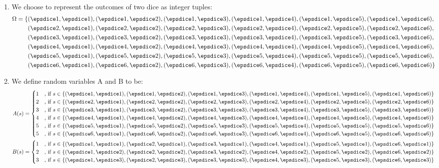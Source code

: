 \paragraph{}
\begin{enumerate}[label=\alph*.]
\item
We choose to represent the outcomes of two dice as integer tuples:
\begin{align*}
\Omega = \{
&(\dA,\dA), (\dA,\dB), (\dA,\dC), (\dA,\dD), (\dA,\dE), (\dA,\dF),  \\
&(\dB,\dA), (\dB,\dB), (\dB,\dC), (\dB,\dD), (\dB,\dE), (\dB,\dF),  \\
&(\dC,\dA), (\dC,\dB), (\dC,\dC), (\dC,\dD), (\dC,\dE), (\dC,\dF),  \\
&(\dD,\dA), (\dD,\dB), (\dD,\dC), (\dD,\dD), (\dD,\dE), (\dD,\dF),  \\
&(\dE,\dA), (\dE,\dB), (\dE,\dC), (\dE,\dD), (\dE,\dE), (\dE,\dF),  \\
&(\dF,\dA), (\dF,\dB), (\dF,\dC), (\dF,\dD), (\dF,\dE), (\dF,\dF) \}
\end{align*}
\item
We define random variables A and B to be:
\begin{align*}
A(s) =
\begin{cases}
1 &\text{, if } s \in \{ (\dA, \dA), (\dA,\dB), (\dA,\dC), (\dA,\dD), (\dA,\dE), (\dA,\dF) \} \\
2 &\text{, if } s \in \{ (\dB, \dA), (\dB,\dB), (\dB,\dC), (\dB,\dD), (\dB,\dE), (\dB,\dF) \} \\
3 &\text{, if } s \in \{ (\dC, \dA), (\dC,\dB), (\dC,\dC), (\dC,\dD), (\dC,\dE), (\dC,\dF) \} \\
4 &\text{, if } s \in \{ (\dD, \dA), (\dD,\dB), (\dD,\dC), (\dD,\dD), (\dD,\dE), (\dD,\dF) \} \\
5 &\text{, if } s \in \{ (\dE, \dA), (\dE,\dB), (\dE,\dC), (\dE,\dD), (\dE,\dE), (\dE,\dF) \} \\
5 &\text{, if } s \in \{ (\dF, \dA), (\dF,\dB), (\dF,\dC), (\dF,\dD), (\dF,\dE), (\dF,\dF) \}
\end{cases} \\
B(s) =
\begin{cases}
1 &\text{, if } s \in \{ (\dA,\dA), (\dB,\dA), (\dC,\dA), (\dD,\dA), (\dE,\dA), (\dF,\dA) \} \\
2 &\text{, if } s \in \{ (\dA,\dB), (\dB,\dB), (\dC,\dB), (\dD,\dB), (\dE,\dB), (\dF,\dB) \} \\
3 &\text{, if } s \in \{ (\dA,\dC), (\dB,\dC), (\dC,\dC), (\dD,\dC), (\dE,\dC), (\dF,\dC) \} \\

\end{cases}
\end{align*}
\end{enumerate}
